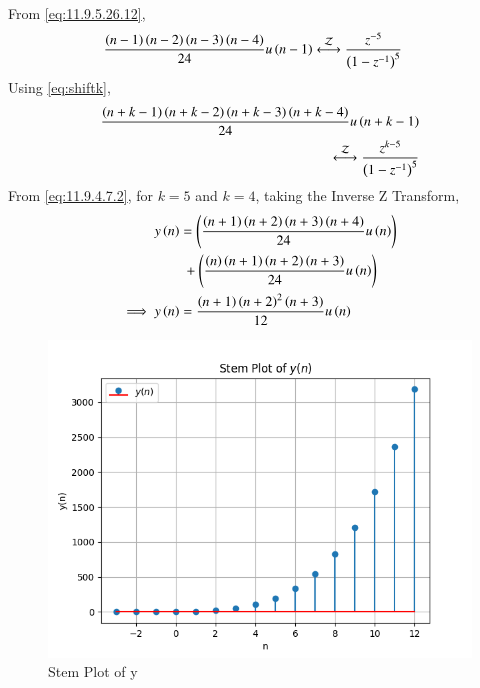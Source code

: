 \documentclass[journal,12pt,twocolumn]{IEEEtran}
\theoremstyle{remark}
\begin{document}
From \eqref{eq:11.9.5.26.12},
\begin{align}
    \frac{\brak{n-1}\brak{n-2}\brak{n-3}\brak{n-4}}{24}u\brak{n-1}&\system{Z}\frac{z^{-5}}{\brak{1-z^{-1}}^5}
\end{align}
Using \eqref{eq:shiftk},
\begin{align}
    \frac{\brak{n+k-1}\brak{n+k-2}\brak{n+k-3}\brak{n+k-4}}{24}u\brak{n+k-1}\notag\\
    \system{Z}\frac{z^{k-5}}{\brak{1-z^{-1}}^5}\label{eq:11.9.4.7.2}
\end{align}
From \eqref{eq:11.9.4.7.2}, for $k=5$ and $k=4$, taking the Inverse Z Transform,
\begin{align}
    y\left(n\right)&=\left(\frac{\left(n+1\right)\left(n+2\right)\left(n+3\right)\left(n+4\right)}{24}u\left(n\right)\right)\notag\\
    &\;+\left(\frac{\left(n\right)\left(n+1\right)\left(n+2\right)\left(n+3\right)}{24}u\left(n\right)\right)\\
    \implies y\left(n\right)&=\frac{\left(n+1\right)\left(n+2\right)^2\left(n+3\right)}{12}u\left(n\right)
\end{align}
\begin{figure}[h!]
    \centering
    \includegraphics[width=1\linewidth]{figs/Figure_1.png}
    \caption{Stem Plot of y}
\end{figure}
\end{document}
